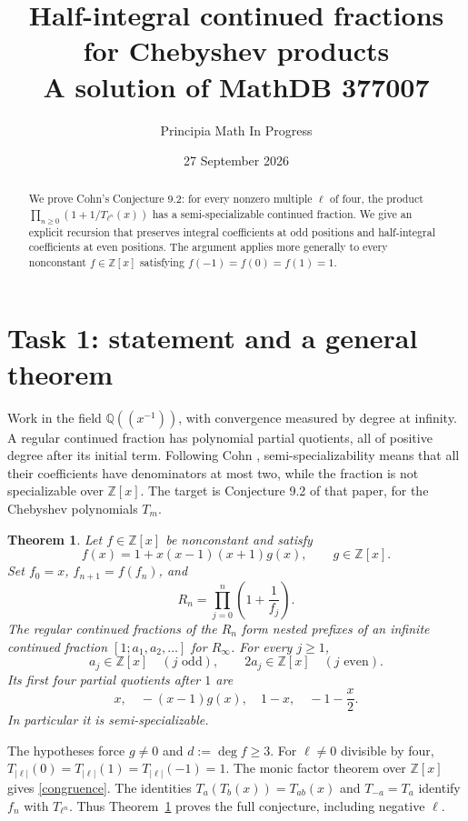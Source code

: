 \documentclass[11pt]{article}
\title{Half-integral continued fractions for Chebyshev products\\
\large A solution of MathDB 377007}
\author{Principia Math In Progress}
\date{27 September 2026}
\newtheorem{theorem}{Theorem}
\newcommand{\ZZ}{\mathbb Z}
\newcommand{\QQ}{\mathbb Q}
\begin{document}
\maketitle
\begin{abstract}
We prove Cohn's Conjecture 9.2: for every nonzero multiple $\ell$ of four,
the product $\prod_{n\geq0}(1+1/T_{\ell^n}(x))$ has a semi-specializable
continued fraction. We give an explicit recursion that preserves integral
coefficients at odd positions and half-integral coefficients at even
positions. The argument applies more generally to every nonconstant
$f\in\ZZ[x]$ satisfying $f(-1)=f(0)=f(1)=1$.
\end{abstract}

\section*{Task 1: statement and a general theorem}
Work in the field $\QQ((x^{-1}))$, with convergence measured by degree at
infinity. A regular continued fraction has polynomial partial quotients,
all of positive degree after its initial term. Following Cohn
\cite[Sections 7 and 9]{C}, semi-specializability means that all their
coefficients have denominators at most two, while the fraction is not
specializable over $\ZZ[x]$. The target is Conjecture 9.2 of that paper,
for the Chebyshev polynomials $T_m$.

\begin{theorem}\label{thm}
Let $f\in\ZZ[x]$ be nonconstant and satisfy
\begin{equation}\label{congruence}
 f(x)=1+x(x-1)(x+1)g(x),\qquad g\in\ZZ[x].
\end{equation}
Set $f_0=x$, $f_{n+1}=f(f_n)$, and
\[
 R_n=\prod_{j=0}^n\left(1+\frac1{f_j}\right).
\]
The regular continued fractions of the $R_n$ form nested prefixes of an
infinite continued fraction $[1;a_1,a_2,\ldots]$ for $R_\infty$.
For every $j\geq1$,
\[
 a_j\in\ZZ[x]\quad(j\text{ odd}),\qquad
 2a_j\in\ZZ[x]\quad(j\text{ even}).
\]
Its first four partial quotients after $1$ are
\begin{equation}\label{first}
 x,\quad -(x-1)g(x),\quad 1-x,\quad -1-\frac{x}{2}.
\end{equation}
In particular it is semi-specializable.
\end{theorem}

The hypotheses force $g\ne0$ and $d:=\deg f\geq3$. For $\ell\ne0$
divisible by four, $T_{|\ell|}(0)=T_{|\ell|}(1)=T_{|\ell|}(-1)=1$.
The monic factor theorem over $\ZZ[x]$ gives \eqref{congruence}.
The identities $T_a(T_b(x))=T_{ab}(x)$ and $T_{-a}=T_a$ identify
$f_n$ with $T_{\ell^n}$. Thus Theorem~\ref{thm} proves the full conjecture,
including negative $\ell$.
\end{document}
